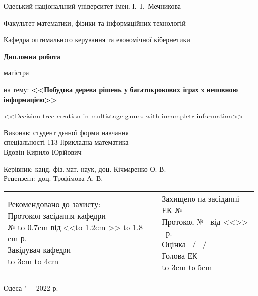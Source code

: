 \thispagestyle{empty}

\begin{center}
Одеський національний університет імені І.~І.~Мечникова

Факультет математики, фізики та інформаційних технологій

Кафедра оптимального керування та економічної кібернетики
\end{center}

\vspace{2.5cm}

\begin{center}
\large
\textbf{Дипломна робота}

магістра

\bigskip

на тему: \textbf{<<Побудова дерева рішень у багатокрокових іграх з неповною інформацією>>}

\bigskip

\small{<<Decision tree creation in multistage games with incomplete information>>}
\end{center}

\vfill

\hfill
\begin{minipage}{0.6\textwidth}
Виконав: студент денної форми навчання\\
спеціальності 113 Прикладна математика \\ %
Вдовін Кирило Юрійович

\medskip

Керівник: канд. фіз.-мат. наук, доц. Кічмаренко О. В.\\
Рецензент: доц. Трофімова А. В.
\end{minipage}

\vfill

\begin{flushleft}
\begin{tabular}{p{5cm}p{2.5cm}p{8cm}}
\makecell[l]{Рекомендовано до захисту:\\
Протокол засідання кафедри\\
№ \hbox to 0.7cm {\hrulefill} від <<\hbox to 1.2cm {\hrulefill}>> \hbox to 1.8 cm {\hrulefill} р.\\
Завідувач кафедри\\
\hbox to 3cm {\hrulefill} \hbox to 4cm{\hrulefill}
} & & \makecell[l]{Захищено на засіданні ЕК № \hrulefill \\
Протокол № \hrulefill\ від <<\hrulefill>> \hrulefill\ р.\\
Оцінка \hrulefill\ / \hrulefill\ / \hrulefill\ \\
Голова ЕК\\
\hbox to 3cm {\hrulefill} \hbox to 5cm{\hrulefill}}
\end{tabular}
\end{flushleft}


\vfill

\begin{center}
Одеса "--- 2022 р.
\end{center}
